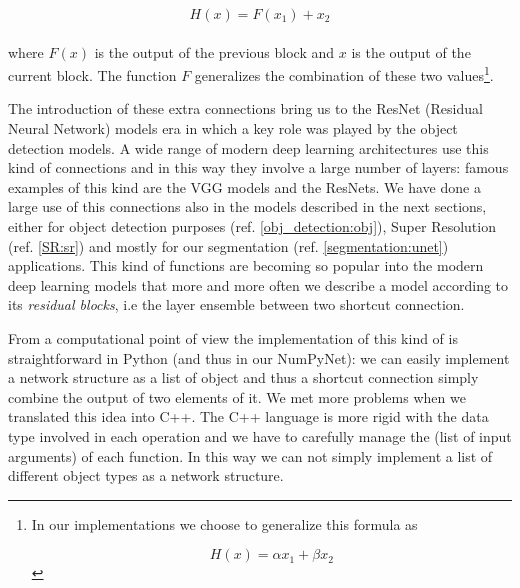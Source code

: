 \documentclass{standalone}
\begin{document}
$$
H(x) = F(x_1) + x_2
$$
\\
where $F(x)$ is the output of the previous block and $x$ is the output of the current block.
The function $F$ generalizes the combination of these two values\footnote{
  In our implementations we choose to generalize this formula as

  $$
  H(x) = \alpha x_1 + \beta x_2
  $$
}.

The introduction of these extra connections bring us to the ResNet (Residual Neural Network) models era in which a key role was played by the object detection models.
A wide range of modern deep learning architectures use this kind of connections and in this way they involve a large number of layers: famous examples of this kind are the VGG models and the ResNets.
We have done a large use of this connections also in the models described in the next sections, either for object detection purposes (ref. \ref{obj_detection:obj}), Super Resolution (ref. \ref{SR:sr}) and mostly for our segmentation (ref. \ref{segmentation:unet}) applications.
This kind of functions are becoming so popular into the modern deep learning models that more and more often we describe a model according to its \emph{residual blocks}, i.e the layer ensemble between two shortcut connection.

From a computational point of view the implementation of this kind of  is straightforward in \textsf{Python} (and thus in our \textsf{NumPyNet}): we can easily implement a network structure as a list of object and thus a shortcut connection simply combine the output of two elements of it.
We met more problems when we translated this idea into \textsf{C++}.
The \textsf{C++} language is more rigid with the data type involved in each operation and we have to carefully manage the  (list of input arguments) of each function.
In this way we can not simply implement a list of different object types as a network structure.
\end{document}
